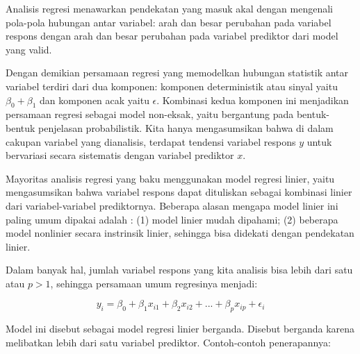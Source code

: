 \documentclass[
]{book}
\begin{document}
Analisis regresi menawarkan pendekatan yang masuk akal dengan mengenali
pola-pola hubungan antar variabel: arah dan besar perubahan pada
variabel respons dengan arah dan besar perubahan pada variabel prediktor
dari model yang valid.

Dengan demikian persamaan regresi yang memodelkan hubungan statistik
antar variabel terdiri dari dua komponen: komponen deterministik atau
sinyal yaitu \(\beta_0 + \beta_1\) dan komponen acak yaitu \(\epsilon\). Kombinasi kedua komponen ini menjadikan persamaan regresi sebagai model non-eksak, yaitu bergantung pada bentuk-bentuk penjelasan probabilistik. Kita hanya mengasumsikan bahwa di dalam cakupan variabel yang dianalisis, terdapat tendensi variabel respons \(y\) untuk bervariasi secara sistematis dengan
variabel prediktor \(x\).

Mayoritas analisis regresi yang baku menggunakan model regresi linier,
yaitu mengasumsikan bahwa variabel respons dapat dituliskan sebagai
kombinasi linier dari variabel-variabel prediktornya. Beberapa alasan
mengapa model linier ini paling umum dipakai adalah \citep{rawlings1998}: (1)
model linier mudah dipahami; (2) beberapa model nonlinier secara
instrinsik linier, sehingga bisa didekati dengan pendekatan linier.

Dalam banyak hal, jumlah variabel respons yang kita analisis bisa lebih dari satu atau \(p>1\), sehingga persamaan umum regresinya menjadi:

\begin{equation} 
y_i=\beta_0 + \beta_1x_{i1} + \beta_2x_{i2} + ... + \beta_px_{ip} + \epsilon_i
\label{eq:persamaan-multi}
\end{equation}

Model ini disebut sebagai model regresi linier berganda. Disebut
berganda karena melibatkan lebih dari satu variabel
prediktor. Contoh-contoh penerapannya:
\end{document}
